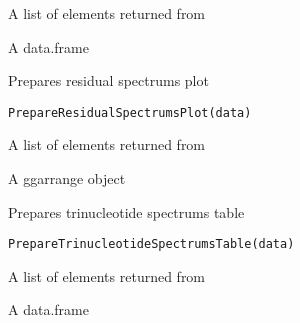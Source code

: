 \documentclass[letterpaper]{book}
\begin{document}
%
\begin{Arguments}
\begin{ldescription}
\item[\code{data}] A list of elements returned from 
\end{ldescription}
\end{Arguments}
%
\begin{Value}
A data.frame
\end{Value}
%
\begin{Description}\relax
Prepares residual spectrums plot
\end{Description}
%
\begin{Usage}
\begin{verbatim}
PrepareResidualSpectrumsPlot(data)
\end{verbatim}
\end{Usage}
%
\begin{Arguments}
\begin{ldescription}
\item[\code{data}] A list of elements returned from 
\end{ldescription}
\end{Arguments}
%
\begin{Value}
A ggarrange object
\end{Value}
%
\begin{Description}\relax
Prepares trinucleotide spectrums table
\end{Description}
%
\begin{Usage}
\begin{verbatim}
PrepareTrinucleotideSpectrumsTable(data)
\end{verbatim}
\end{Usage}
%
\begin{Arguments}
\begin{ldescription}
\item[\code{data}] A list of elements returned from 
\end{ldescription}
\end{Arguments}
%
\begin{Value}
A data.frame
\end{Value}
\end{document}
